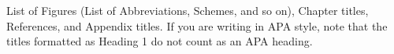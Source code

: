   List of Figures (List of Abbreviations, Schemes, and so on), Chapter titles, References, and Appendix titles. If you are writing in APA style, note that the titles formatted as Heading 1 do not count as an APA heading. %








